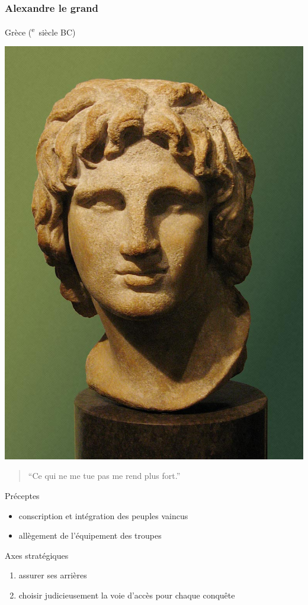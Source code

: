 \documentclass{article}
\newcommand{\cRM}[1]{\MakeUppercase{\romannumeral #1}}  %
\newcommand{\siecle}[1]{\cRM{#1}\textsuperscript{e}~siècle}
\begin{document}
\cite{tzu1997art, sun_tzu_fighting, sun_tzu_wiki}

\subsubsection{Alexandre le grand}
Grèce (\siecle{4} BC)
\hfill \begin{minipage}{5cm}
\includegraphics[width=\linewidth]{../ressources/AlexanderTheGreat_Bust}
\end{minipage}
\begin{quote}“Ce qui ne me tue pas me rend plus fort.”\end{quote}

Préceptes
\begin{itemize}
\item conscription et intégration des peuples vaincus
\item allègement de l'équipement des troupes
\end{itemize}
Axes stratégiques
\begin{enumerate}
\item assurer ses arrières
\item choisir judicieusement la voie d'accès pour chaque conquête
\end{enumerate}
\cite{alexander_the_great, alexandre_balkans}
\end{document}
